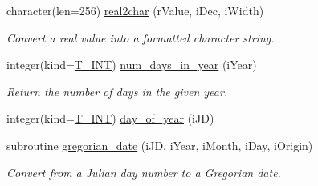 \begin{DoxyCompactItemize}
character(len=256) \hyperlink{namespacetypes_afcafa126194a2f1c3236f7edfb62c38d}{real2char} (rValue, iDec, iWidth)
\begin{DoxyCompactList}\small\item\em Convert a real value into a formatted character string. \item\end{DoxyCompactList}\item 
integer(kind=\hyperlink{namespacetypes_a4e4d040a4425196c4d43be63e7e6103a}{T\_\-INT}) \hyperlink{namespacetypes_ab9e5596db13055bdc0bc6008dfb3b946}{num\_\-days\_\-in\_\-year} (iYear)
\begin{DoxyCompactList}\small\item\em Return the number of days in the given year. \item\end{DoxyCompactList}\item 
integer(kind=\hyperlink{namespacetypes_a4e4d040a4425196c4d43be63e7e6103a}{T\_\-INT}) \hyperlink{namespacetypes_a08910935abbfabf0c927ac7bc6f8b36a}{day\_\-of\_\-year} (iJD)
\item 
subroutine \hyperlink{namespacetypes_ae7e76a43f7773d483dbf9814b78ed2b3}{gregorian\_\-date} (iJD, iYear, iMonth, iDay, iOrigin)
\begin{DoxyCompactList}\small\item\em Convert from a Julian day number to a Gregorian date. \item\end{DoxyCompactList}\end{DoxyCompactItemize}
